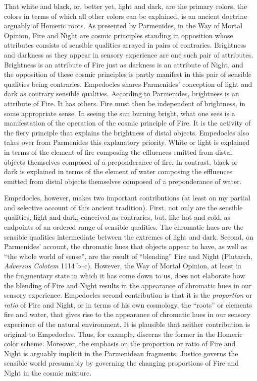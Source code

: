 That white and black, or, better yet, light and dark, are the primary colors, the colors in terms of which all other colors can be explained, is an ancient doctrine arguably of Homeric roots. As presented by Parmenides, in the Way of Mortal Opinion, Fire and Night are cosmic principles standing in opposition whose attributes consists of sensible qualities arrayed in pairs of contraries. Brightness and darkness as they appear in sensory experience are one such pair of attributes. Brightness is an attribute of Fire just as darkness is an attribute of Night, and the opposition of these cosmic principles is partly manifest in this pair of sensible qualities being contraries. Empedocles shares Parmenides' conception of light and dark as contrary sensible qualities. According to Parmenides, brightness is an attribute of Fire. It has others. Fire must then be independent of brightness, in some appropriate sense. In seeing the sun burning bright, what one sees is a manifestation of the operation of the cosmic principle of Fire. It is the activity of the fiery principle that explains the brightness of distal objects. Empedocles also takes over from Parmenides this explanatory priority. White or light is explained in terms of the element of fire composing the effluences emitted from distal objects themselves composed of a preponderance of fire. In contrast, black or dark is explained in terms of the element of water composing the effluences emitted from distal objects themselves composed of a preponderance of water. 

Empedocles, however, makes two important contributions (at least on my partial and selective account of this ancient tradition). First, not only are the sensible qualities, light and dark, conceived as contraries, but, like hot and cold, as endpoints of an ordered range of sensible qualities. The chromatic hues are the sensible qualities intermediate between the extremes of light and dark. Second, on Parmenides' account, the chromatic hues that objects appear to have, as well as ``the whole world of sense'', are the result of ``blending'' Fire and Night (Plutarch, \emph{Adversus Colotem} 1114 b--c). However, the Way of Mortal Opinion, at least in the fragmentary state in which it has come down to us, does not elaborate how the blending of Fire and Night results in the appearance of chromatic hues in our sensory experience. Empedocles second contribution is that it is the \emph{proportion} or \emph{ratio} of Fire and Night, or in terms of his own cosmology, the ``roots'' or elements fire and water, that gives rise to the appearance of chromatic hues in our sensory experience of the natural environment. It is plausible that neither contribution is original to Empedocles. Thus, for example, \citet{Gladstone:1858fk} discerns the former in the Homeric color scheme. Moreover, the emphasis on the proportion or ratio of Fire and Night is arguably implicit in the Parmenidean fragments: Justice governs the sensible world presumably by governing the changing proportions of Fire and Night in the cosmic mixture.

